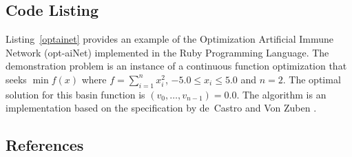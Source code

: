 \subsection{Code Listing}
Listing~\ref{optainet} provides an example of the Optimization Artificial Immune Network (opt-aiNet) implemented in the Ruby Programming Language.
The demonstration problem is an instance of a continuous function optimization that seeks $\min f(x)$ where $f=\sum_{i=1}^n x_{i}^2$, $-5.0\leq x_i \leq 5.0$ and $n=2$. The optimal solution for this basin function is $(v_0,\ldots,v_{n-1})=0.0$.
The algorithm is an implementation based on the specification by de~Castro and Von Zuben \cite{Castro2002c}.



\subsection{References}

% 
% 
